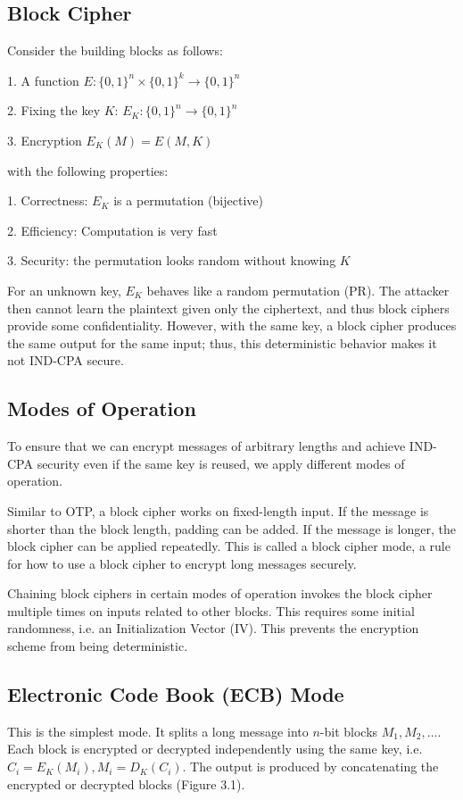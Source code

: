 \subsection{Block Cipher}
Consider the building blocks as follows:

1. A function \(E: \{0, 1\}^n \times \{0, 1\}^k \to \{0, 1\}^n\)

2. Fixing the key \(K\): \(E_K: \{0, 1\}^n \to \{0, 1\}^n\)

3. Encryption \(E_K(M) = E(M, K)\)

with the following properties:

1. Correctness: \(E_K\) is a permutation (bijective)

2. Efficiency: Computation is very fast

3. Security: the permutation looks random without knowing \(K\)

For an unknown key, \(E_K\) behaves like a random permutation (PR). The attacker then cannot learn the plaintext given only the ciphertext, and thus block ciphers provide some confidentiality. However, with the same key, a block cipher produces the same output for the same input; thus, this deterministic behavior makes it not IND-CPA secure.

\subsection{Modes of Operation}
To ensure that we can encrypt messages of arbitrary lengths and achieve IND-CPA security even if the same key is reused, we apply different modes of operation.

Similar to OTP, a block cipher works on fixed-length input. If the message is shorter than the block length, padding can be added. If the message is longer, the block cipher can be applied repeatedly. This is called a block cipher mode, a rule for how to use a block cipher to encrypt long messages securely.

Chaining block ciphers in certain modes of operation invokes the block cipher multiple times on inputs related to other blocks. This requires some initial randomness, i.e. an Initialization Vector (IV). This prevents the encryption scheme from being deterministic.

\subsection{Electronic Code Book (ECB) Mode}
This is the simplest mode. It splits a long message into \(n\)-bit blocks \(M_1, M_2, \dots\). Each block is encrypted or decrypted independently using the same key, i.e. \(C_i = E_K (M_i), M_i = D_K (C_i)\). The output is produced by concatenating the encrypted or decrypted blocks (Figure 3.1).

